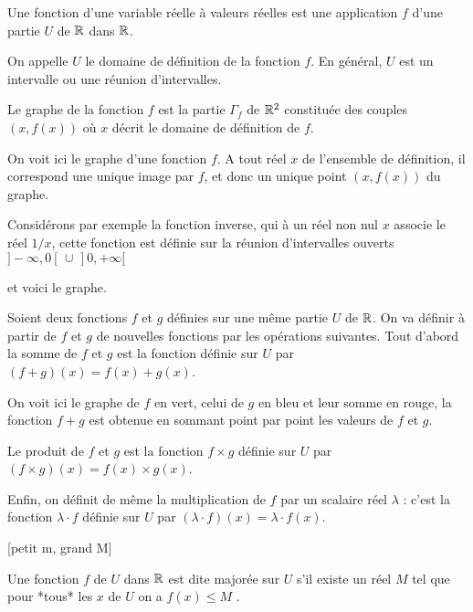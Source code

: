 \diapo

Une fonction d'une variable réelle à valeurs réelles est une application $f$ d'une partie $U$ de $\mathbb{R}$ dans $\mathbb{R}$.
 
\change
On appelle $U$ le domaine de définition de la fonction $f$. En général, $U$ est un intervalle ou une réunion d'intervalles.

\change
Le graphe de la fonction $f$ est la partie $\Gamma_f$ de $\mathbb{R}^2$ constituée des couples $(x,f(x)) $ où $x$ décrit le domaine de définition de $f$.

\change
On voit ici le graphe d'une fonction $f$. A tout réel $x$ de l'ensemble de définition, il correspond une unique image par $f$, et donc un unique point $(x,f(x)) $ du graphe.



\diapo

Considérons par exemple la fonction inverse, qui à un réel 
non nul $x$ associe le réel $1/x$, cette fonction est définie 
sur la réunion d'intervalles ouverts $ ]-\infty,0[ \,\cup \, ]0,+\infty[$

\change
et voici le graphe.


\diapo

Soient deux fonctions $f$ et $g$ définies sur une même partie $U$ de $\mathbb{R}$. On va définir à partir de $f$ et $g$ de nouvelles fonctions par les opérations suivantes. Tout d'abord la somme de $f$ et $g$ est la fonction définie sur $U$ par $(f+g)(x) = f(x) + g(x)$.

\change
On voit ici le graphe de $f$ en vert, celui de  $g$ en bleu et leur somme en rouge, 
la fonction $f+g$ est obtenue en sommant point par point les valeurs de $f$ et $g$.

\change
Le produit de $f$ et $g$ est la fonction $f\times g$ définie sur $U$ par $(f\times g)(x) = f(x) \times g(x)$.
  
\change
Enfin, on définit de même la multiplication de $f$ par un scalaire réel $\lambda$ : c'est la fonction $\lambda\cdot f$ définie sur $U$ par $(\lambda\cdot f)(x) =\lambda\cdot f(x)$.
 

\diapo

[petit m, grand M]

Une fonction $f$ de $U$ dans $\mathbb{R}$ est dite majorée sur $U$ 
s'il existe un réel $M$ tel que pour *tous* les $x$ de $U$ on a $f(x)\leq M$ .
 
